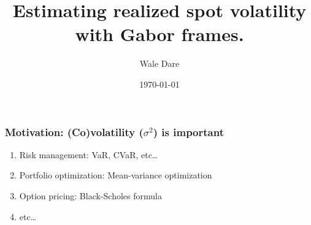 \documentclass[fleqn]{beamer}
\title[Short title]{Estimating realized spot  volatility with Gabor frames.} %
\author{Wale Dare} %
\institute[University of St. Gallen] %
{
University of St. Gallen \\ %
\medskip
}
\date{\today} %
\begin{document}
\begin{frame}
\titlepage %
\end{frame}
\begin{frame}
  \frametitle{Motivation: (Co)volatility ($\sigma^2$) is important}
\begin{enumerate}
  \item Risk management: VaR, CVaR, etc\ldots
  \item Portfolio optimization: Mean-variance optimization 
  \item Option pricing: Black-Scholes formula
  \item etc\ldots
\end{enumerate}
\tableofcontents %
\end{frame}
\end{document}
